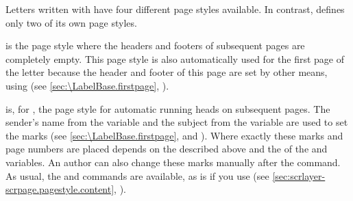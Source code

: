 \begin{Declaration}
\end{Declaration}%
%
%
%
%
Letters written with  have four
different page styles available. In contrast,
 defines only two of its own
page styles.
\begin{description}
\item[{\PageStyle{empty}}]
   is the page style where the headers and footers of
  subsequent pages are completely empty. This page style is also automatically
  used for the first page of the letter because the header and footer of this
  page are set by other means, using
   (see
  \autoref{sec:\LabelBase.firstpage}, ).
\item[{\PageStyle{headings}}]
   is, for ,
  the page style for automatic running heads on subsequent pages. The sender's
  name from the 
  variable and the subject from the
   variable are
  used to set the marks (see \autoref{sec:\LabelBase.firstpage},
   and
  ). Where exactly these marks and
  page numbers are placed depends on the
   described above and the
   of the
   and
   variables. An
  author can also change these marks manually after the
   command. As usual, the
   and 
  commands are available, as is  if you
  use \hyperref[cha:scrlayer-scrpage]{}%
  (see \autoref{sec:scrlayer-scrpage.pagestyle.content},
  ).
    

\end{description}
